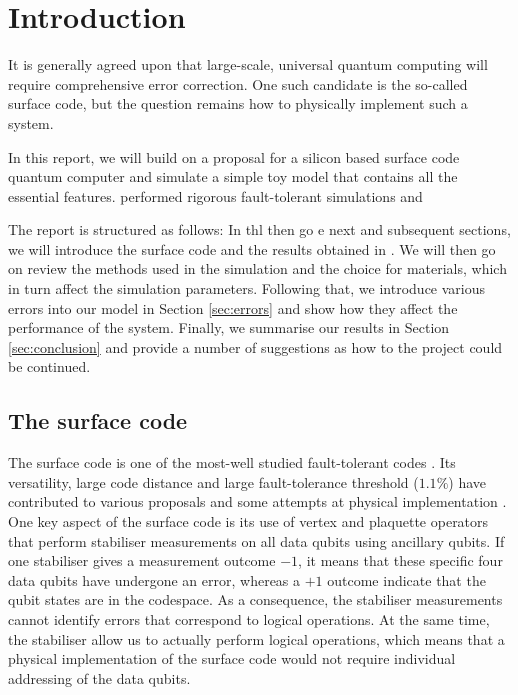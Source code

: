 
\section{Introduction} \label{sec:Introduction}

It is generally agreed upon that large-scale, universal quantum computing will require comprehensive error correction. One such candidate is the so-called surface code, but the question remains how to physically implement such a system. 

In this report, we will build on a proposal for a silicon based surface code quantum computer and simulate a simple toy model that contains all the essential features. \citet{OGorman2016} performed rigorous fault-tolerant simulations and 




The report is structured as follows: In thl then go e next and subsequent sections, we will introduce the surface code and the results obtained in \cite{the paper}. We will then go on review the methods used in the simulation and the choice for materials, which in turn affect the simulation parameters. Following that, we introduce various errors into our model in Section \ref{sec:errors} and show how they affect the performance of the system. Finally, we summarise our results in Section \ref{sec:conclusion} and provide a number of suggestions as how to the project could be continued.  

\subsection{The surface code}
The surface code is one of the most-well studied fault-tolerant codes \cite{Wang2011,Fowler2012}. Its versatility, large code distance and large fault-tolerance threshold ($1.1\%$) have contributed to various proposals \cite{Fowler2012,Pica2014,Tosi2015,Hill2015,OGorman2016} and some attempts at physical implementation \cite{Barends2014,Kelly2015}. One key aspect of the surface code is its use of vertex and plaquette operators that perform stabiliser measurements on all data qubits using ancillary qubits. If one stabiliser gives a measurement outcome $-1$, it means that these specific four data qubits have undergone an error, whereas a $+1$ outcome indicate that the qubit states are in the codespace. As a consequence, the stabiliser measurements cannot identify errors that correspond to logical operations. At the same time, the stabiliser allow us to actually perform logical operations, which means that a physical implementation of the surface code would not require individual addressing of the data qubits. 

